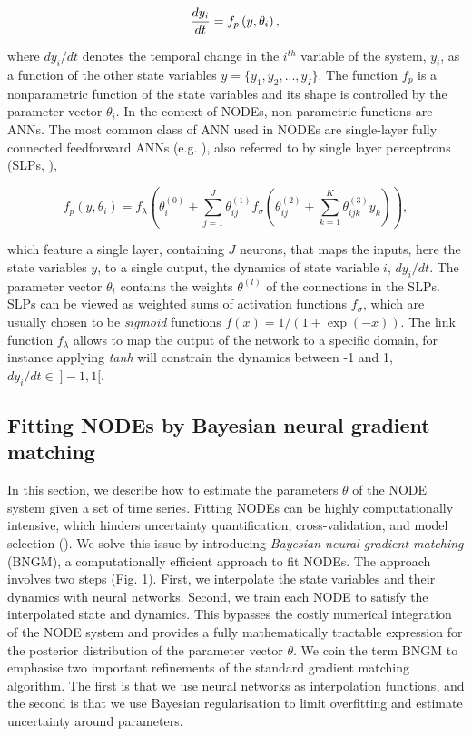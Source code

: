 \documentclass[11pt, oneside]{article}
\begin{document}
\vspace{-0.5cm}
\begin{equation}
    \frac{dy_i}{dt} = f_p \left(y,\theta_i \right), \\
\end{equation}

where $dy_i/dt$ denotes the temporal change in the $i^{th}$ variable of the system, $y_i$, as a function of the other state variables $y = \{ y_1, y_2, ..., y_I\}$.
The function $f_p$ is a nonparametric function of the state variables and its shape is controlled by the parameter vector $\theta_i$.
In the context of NODEs, non-parametric functions are ANNs.
The most common class of ANN used in NODEs are single-layer fully connected feedforward ANNs (e.g. \cite{Wu2005}), also referred to by single layer perceptrons (SLPs, \cite{Bonnaffe2021a}),

\vspace{-0.5cm}
\begin{equation}
    f_p \left(y, \theta_i \right) = f_\lambda \left( \theta_i^{(0)} + \sum_{j=1}^{J} \theta^{(1)}_{ij} f_\sigma \left( \theta^{(2)}_{ij} + \sum_{k=1}^{K} \theta^{(3)}_{ijk} y_k \right) \right),
\end{equation}

which feature a single layer, containing $J$ neurons, that maps the inputs, here the state variables $y$, to a single output, the dynamics of state variable $i$, $dy_i/dt$.
The parameter vector $\theta_i$ contains the weights $\theta^{(l)}$ of the connections in the SLPs.
SLPs can be viewed as weighted sums of activation functions $f_\sigma$, which are usually chosen to be \textit{sigmoid} functions $f(x) = 1/(1+\exp(-x))$.
The link function $f_\lambda$ allows to map the output of the network to a specific domain, for instance applying \textit{tanh} will constrain the dynamics between -1 and 1, $dy_i/dt \in~]-1,1[$. 

\subsection{Fitting NODEs by Bayesian neural gradient matching}

In this section, we describe how to estimate the parameters $\theta$ of the NODE system given a set of time series. 
Fitting NODEs can be highly computationally intensive, which hinders uncertainty quantification, cross-validation, and model selection (\cite{Bonnaffe2021a}).
We solve this issue by introducing \textit{Bayesian neural gradient matching} (BNGM), a computationally efficient approach to fit NODEs.
The approach involves two steps (Fig. 1).
First, we interpolate the state variables and their dynamics with neural networks.
Second, we train each NODE to satisfy the interpolated state and dynamics.
This bypasses the costly numerical integration of the NODE system and provides a fully mathematically tractable expression for the posterior distribution of the parameter vector $\theta$. 
We coin the term BNGM to emphasise two important refinements of the standard gradient matching algorithm. 
The first is that we use neural networks as interpolation functions, and the second is that we use Bayesian regularisation to limit overfitting and estimate uncertainty around parameters.
\end{document}
